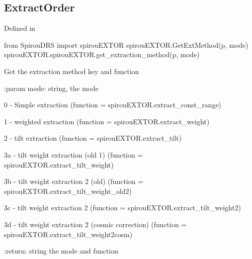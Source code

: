 \noindent\begin{minipage}{\textwidth}
\subsection{ExtractOrder}

Defined in \spirouEXTOR{}

\begin{pythonbox}
from SpirouDRS import spirouEXTOR
spirouEXTOR.GetExtMethod(p, mode)
spirouEXTOR.spirouEXTOR.get_extraction_method(p, mode)
\end{pythonbox}

\begin{pythondocstring}
Get the extraction method key and function

:param mode: string, the mode

    0 - Simple extraction
            (function = spirouEXTOR.extract_const_range)

    1 - weighted extraction
            (function = spirouEXTOR.extract_weight)

    2 - tilt extraction
            (function = spirouEXTOR.extract_tilt)

    3a - tilt weight extraction (old 1)
            (function = spirouEXTOR.extract_tilt_weight)

    3b - tilt weight extraction 2 (old)
            (function = spirouEXTOR.extract_tilt_weight_old2)

    3c - tilt weight extraction 2
            (function = spirouEXTOR.extract_tilt_weight2)

    3d - tilt weight extraction 2 (cosmic correction)
            (function = spirouEXTOR.extract_tilt_weight2cosm)
            
:return: string the mode and function
\end{pythondocstring}
\end{minipage}



